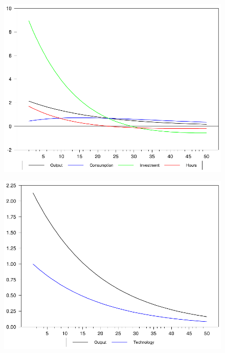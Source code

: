 \documentclass{beamer}
\begin{document}
\begin{frame}
  \begin{figure}
    \includegraphics[scale=.9]{rbc4.eps}
  \end{figure}
\end{frame}

\begin{frame}
  \begin{figure}
    \includegraphics[scale=.9]{rbc5.eps}
  \end{figure}
\end{frame}
\end{document}
